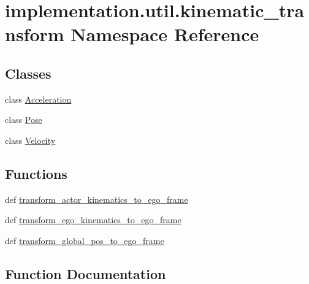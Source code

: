 \hypertarget{namespaceimplementation_1_1util_1_1kinematic__transform}{}\section{implementation.\+util.\+kinematic\+\_\+transform Namespace Reference}
\label{namespaceimplementation_1_1util_1_1kinematic__transform}
\subsection*{Classes}
\begin{DoxyCompactItemize}
\item 
class \hyperlink{classimplementation_1_1util_1_1kinematic__transform_1_1_acceleration}{Acceleration}
\item 
class \hyperlink{classimplementation_1_1util_1_1kinematic__transform_1_1_pose}{Pose}
\item 
class \hyperlink{classimplementation_1_1util_1_1kinematic__transform_1_1_velocity}{Velocity}
\end{DoxyCompactItemize}
\subsection*{Functions}
\begin{DoxyCompactItemize}
\item 
def \hyperlink{namespaceimplementation_1_1util_1_1kinematic__transform_a4db44a7aa3adf311ad8c66f43a83fd0f}{transform\+\_\+actor\+\_\+kinematics\+\_\+to\+\_\+ego\+\_\+frame}
\item 
def \hyperlink{namespaceimplementation_1_1util_1_1kinematic__transform_a966b7ee38d8ed0c7ef3937e9b0e9480c}{transform\+\_\+ego\+\_\+kinematics\+\_\+to\+\_\+ego\+\_\+frame}
\item 
def \hyperlink{namespaceimplementation_1_1util_1_1kinematic__transform_a716f885d41cc2344d3fb8a52b1140939}{transform\+\_\+global\+\_\+pos\+\_\+to\+\_\+ego\+\_\+frame}
\end{DoxyCompactItemize}


\subsection{Function Documentation}
\mbox{\label{namespaceimplementation_1_1util_1_1kinematic__transform_a4db44a7aa3adf311ad8c66f43a83fd0f}} 
